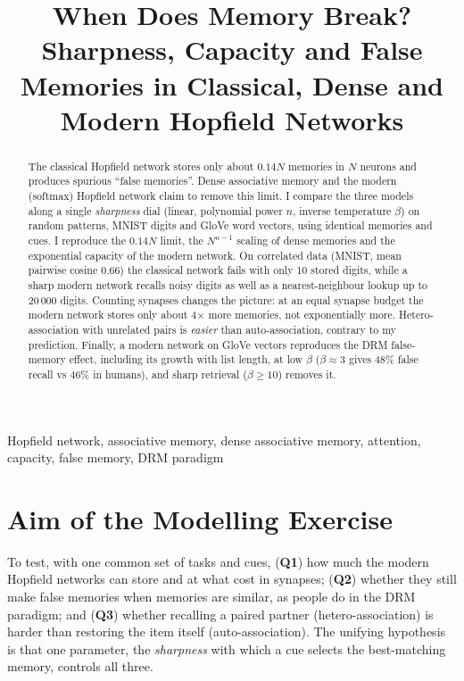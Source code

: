 \documentclass[conference]{IEEEtran}
\begin{document}
\title{When Does Memory Break? Sharpness, Capacity and False Memories in Classical, Dense and Modern Hopfield Networks}

\author{
}

\maketitle

\begin{abstract}
The classical Hopfield network stores only about $0.14N$ memories in $N$ neurons and produces spurious ``false memories''. Dense associative memory and the modern (softmax) Hopfield network claim to remove this limit. I compare the three models along a single \emph{sharpness} dial (linear, polynomial power $n$, inverse temperature $\beta$) on random patterns, MNIST digits and GloVe word vectors, using identical memories and cues. I reproduce the $0.14N$ limit, the $N^{n-1}$ scaling of dense memories and the exponential capacity of the modern network. On correlated data (MNIST, mean pairwise cosine 0.66) the classical network fails with only 10 stored digits, while a sharp modern network recalls noisy digits as well as a nearest-neighbour lookup up to 20\,000 digits. Counting synapses changes the picture: at an equal synapse budget the modern network stores only about 4$\times$ more memories, not exponentially more. Hetero-association with unrelated pairs is \emph{easier} than auto-association, contrary to my prediction. Finally, a modern network on GloVe vectors reproduces the DRM false-memory effect, including its growth with list length, at low $\beta$ ($\beta\approx3$ gives 48\% false recall vs 46\% in humans), and sharp retrieval ($\beta\ge10$) removes it.
\end{abstract}

\begin{IEEEkeywords}
Hopfield network, associative memory, dense associative memory, attention, capacity, false memory, DRM paradigm
\end{IEEEkeywords}

\section{Aim of the Modelling Exercise}
To test, with one common set of tasks and cues, (\textbf{Q1}) how much the modern Hopfield networks can store and at what cost in synapses; (\textbf{Q2}) whether they still make false memories when memories are similar, as people do in the DRM paradigm; and (\textbf{Q3}) whether recalling a paired partner (hetero-association) is harder than restoring the item itself (auto-association). The unifying hypothesis is that one parameter, the \emph{sharpness} with which a cue selects the best-matching memory, controls all three.
\end{document}

